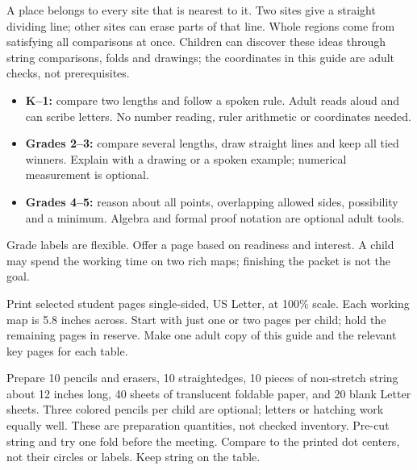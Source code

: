 \documentclass[letterpaper,11pt]{article}
\newcommand{\heading}[1]{\par\vspace{5pt}{\large\bfseries #1}\par}
\begin{document}
\heading{What the children are exploring}
A place belongs to every site that is nearest to it. Two sites give a straight dividing line; other sites can erase parts of that line. Whole regions come from satisfying all comparisons at once. Children can discover these ideas through string comparisons, folds and drawings; the coordinates in this guide are adult checks, not prerequisites.

\heading{Prerequisites and flexible entry points}
\begin{itemize}
\item \textbf{K--1:} compare two lengths and follow a spoken rule. Adult reads aloud and can scribe letters. No number reading, ruler arithmetic or coordinates needed.
\item \textbf{Grades 2--3:} compare several lengths, draw straight lines and keep all tied winners. Explain with a drawing or a spoken example; numerical measurement is optional.
\item \textbf{Grades 4--5:} reason about all points, overlapping allowed sides, possibility and a minimum. Algebra and formal proof notation are optional adult tools.
\end{itemize}
Grade labels are flexible. Offer a page based on readiness and interest. A child may spend the working time on two rich maps; finishing the packet is not the goal.

\heading{Practical preparation for ten children and three adults}
Print selected student pages single-sided, US Letter, at 100\% scale. Each working map is 5.8 inches across. Start with just one or two pages per child; hold the remaining pages in reserve. Make one adult copy of this guide and the relevant key pages for each table.

Prepare 10 pencils and erasers, 10 straightedges, 10 pieces of non-stretch string about 12 inches long, 40 sheets of translucent foldable paper, and 20 blank Letter sheets. Three colored pencils per child are optional; letters or hatching work equally well. These are preparation quantities, not checked inventory. Pre-cut string and try one fold before the meeting. Compare to the printed dot centers, not their circles or labels. Keep string on the table.
\end{document}
